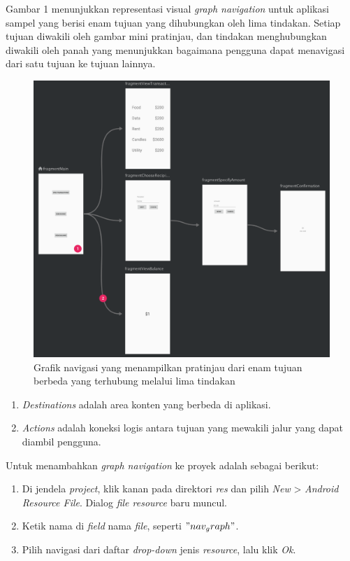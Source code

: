 \begin{enumerate}
Gambar 1 menunjukkan representasi visual \textit{graph navigation} untuk aplikasi sampel yang berisi enam tujuan yang dihubungkan oleh lima tindakan. Setiap tujuan diwakili oleh gambar mini pratinjau, dan tindakan menghubungkan diwakili oleh panah yang menunjukkan bagaimana pengguna dapat menavigasi dari satu tujuan ke tujuan lainnya.
\begin{figure}[H]
	\centering
	\includegraphics[keepaspectratio, width=12cm]{gambar/navigation_graph1}
	\caption{Grafik navigasi yang menampilkan pratinjau dari enam tujuan berbeda yang terhubung melalui lima tindakan \citep{developerandroid}}
	\label{gambar:gambar_38}
\end{figure}

	\begin{enumerate}
	\item \textit{Destinations} adalah area konten yang berbeda di aplikasi.
	\item \textit{Actions} adalah koneksi logis antara tujuan yang mewakili jalur yang dapat diambil pengguna.
	\end{enumerate}
	
Untuk menambahkan \textit{graph navigation} ke proyek adalah sebagai berikut:
	\begin{enumerate}
	\item Di jendela \textit{project}, klik kanan pada direktori \textit{res} dan pilih \textit{New} > \textit{Android Resource File}. Dialog \textit{file resource} baru muncul.
	\item Ketik nama di \textit{field} nama \textit{file}, seperti \textit{$"nav_graph"$}.
	\item Pilih navigasi dari daftar \textit{drop-down} jenis \textit{resource}, lalu klik \textit{Ok}.
	\end{enumerate}
	

\end{enumerate}
